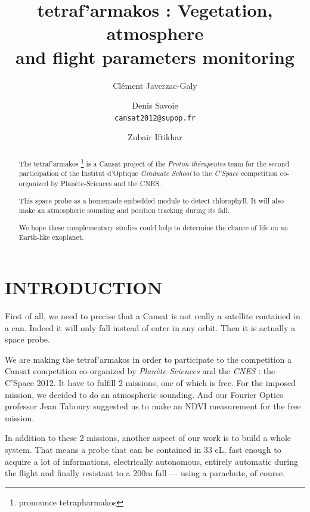 \documentclass[twocolumn,10pt]{article}
\newcommand\tet{\textgreek{tetraf'armakos} }
\begin{document}
\title{\Huge \tet %
: Vegetation, atmosphere\\ and flight parameters monitoring} 
\author{Clément Javerzac-Galy \and{Denis Savoie}\\
\texttt{cansat2012@supop.fr}
\and{Zubair Iftikhar}
}
\date{}
\maketitle
 
\pagestyle{empty}
\thispagestyle{empty}
 
\begin{abstract}
    \begin{bfseries}
    \par \small The \tet \footnote{pronounce tetrapharmakos} is a Cansat project of the \textit{Proton-thérapeutes} team for the second participation of the Institut d'Optique \textit{Graduate School} to the \textit{C'Space} competition co-organized by Planète-Sciences and the CNES. 
    \par \small This space probe as a homemade embedded module to detect chlorophyll. It will also make an atmospheric sounding and position tracking during its fall.
    \par \small We hope these complementary studies could help to determine the chance of life on an Earth-like exoplanet.
     \end{bfseries}
\end{abstract}
\section{INTRODUCTION}%
    \par First of all, we need to precise that a Cansat is not really a satellite contained in a can. Indeed it will only fall instead of enter in any orbit. Then it is actually a space probe.
    \par We are making the \tet in order to participate to the competition a Cansat competition co-organized by \textit{Planète-Sciences} and the \textit{CNES} : the C'Space 2012. It have to fulfill 2 missions, one of which is free. For the imposed mission, we decided to do an atmospheric sounding. And our Fourier Optics professor Jean Taboury suggested us to make an NDVI measurement for the free mission.
    \par In addition to these 2 missions, another aspect of our work is to build a whole system. That means a probe that can be contained in 33 cL, fast enough to acquire a lot of informations, electrically autonomous, entirely automatic during the flight and finally resistant to a 200m fall --- using a parachute, of course.
\end{document}
